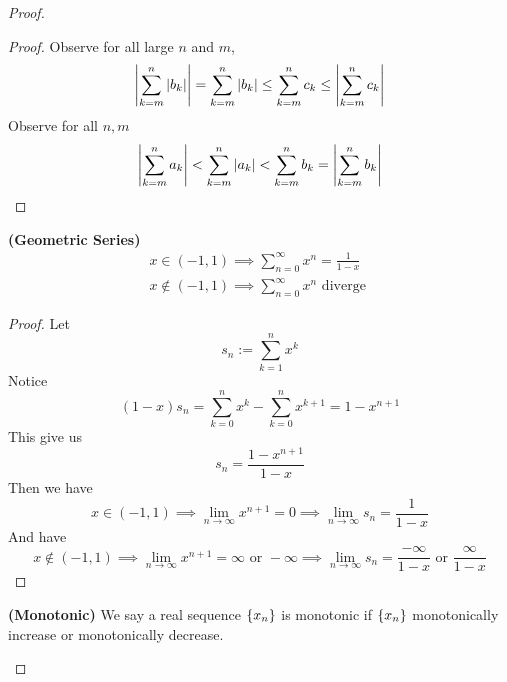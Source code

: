 \documentclass{report}
\begin{document}
\begin{proof}
\begin{theorem}
\end{theorem}
\begin{proof}
Observe for all large $n$ and $m$,
\begin{equation}
\left|\sum_{k=m}^n \left|b_k\right|\right|=\sum_{k=m}^n \left|b_k\right|\leq \sum_{k=m}^n c_k\leq \left|\sum_{k=m}^n c_k\right|
\end{equation}
Observe for all $n,m$
\begin{equation}
\left|\sum_{k=m}^n a_k\right|<\sum_{k=m}^n \left|a_k\right|<\sum_{k=m}^n b_k=\left|\sum_{k=m}^n b_k\right|
\end{equation}
\end{proof}
\begin{theorem}
\label{2.2.8}
\textbf{(Geometric Series)} 
\begin{align}
x\in (-1,1)\implies \sum_{n=0}^\infty x^n=\frac{1}{1-x}\\
x\not\in (-1,1)\implies \sum_{n=0}^\infty x^n\text{ diverge }
\end{align}
\end{theorem}
\begin{proof}
Let 
\begin{equation}
s_n:=\sum_{k=1}^n x^k
\end{equation}
Notice
\begin{equation}
  (1-x)s_n=\sum_{k=0}^n x^k-\sum_{k=0}^n x^{k+1}=1-x^{n+1}
\end{equation}
This give us
\begin{equation}
s_n=\frac{1-x^{n+1}}{1-x}
\end{equation}
Then we have
\begin{equation}
x\in (-1,1)\implies \lim_{n\to\infty}x^{n+1}=0\implies \lim_{n\to\infty}s_n=\frac{1}{1-x}
\end{equation}
And have
\begin{equation}
x\not\in (-1,1)\implies \lim_{n\to\infty}x^{n+1}=\infty\text{ or }-\infty\implies \lim_{n\to\infty}s_n= \frac{-\infty}{1-x}\text{ or }\frac{\infty}{1-x}
\end{equation}
\end{proof}
\begin{definition}
\label{2.2.9}
\textbf{(Monotonic)} We say a real sequence $\{ x_n \}$ is monotonic if $\{ x_n \}$ monotonically increase or monotonically decrease.

\end{definition}
\end{proof}
\end{document}
